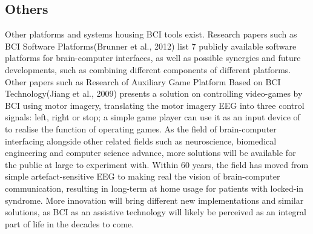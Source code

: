 \subsection{Others}
Other platforms and systems housing BCI tools exist. Research papers such as BCI Software Platforms(Brunner et al., 2012) list 7 publicly available software platforms for brain-computer interfaces, as well as possible synergies and future developments, such as combining different components of different platforms\cite{Brunner_2012}. Other papers such as Research of Auxiliary Game Platform Based on BCI Technology(Jiang et al., 2009) presents a solution on controlling video-games by BCI using motor imagery, translating the motor imagery EEG into three control signals: left, right or stop; a simple game player can use it as an input device of to realise the function of operating games\cite{Jiang_2009}.
\vspace{\baselineskip}\newline
As the field of brain-computer interfacing alongside other related fields such as neuroscience, biomedical engineering and computer science advance, more solutions will be available for the public at large to experiment with. Within 60 years, the field has moved from simple artefact-sensitive EEG to making real the vision of brain-computer communication, resulting in long-term at home usage for patients with locked-in syndrome\cite{K_bler_2019}. More innovation will bring different new implementations and similar solutions, as BCI as an assistive technology will likely be perceived as an integral part of life in the decades to come\cite{K_bler_2019}.
